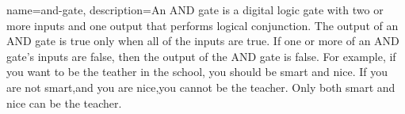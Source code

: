 {
    name=and-gate,
    description={An AND gate is a digital logic gate with two or more inputs and one output that performs logical conjunction. The output of an AND gate is true only when all of the inputs are true. If one or more of an AND gate's inputs are false, then the output of the AND gate is false. For example, if you want to be the teather in the school, you should be smart and nice. If you are not smart,and you are nice,you cannot be the teacher.  Only both smart and nice can be the teacher.}
}
